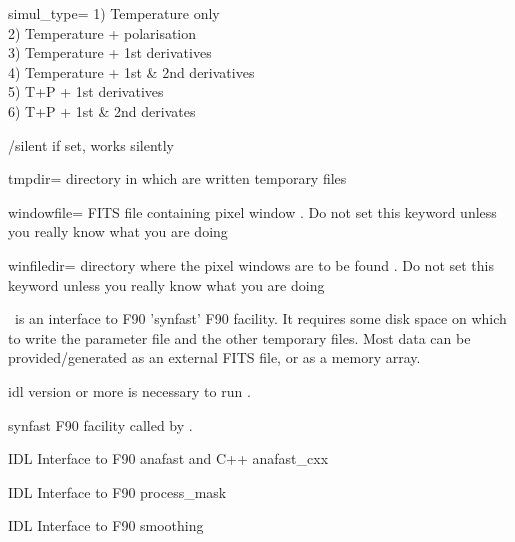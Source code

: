 \begin{keywords}
\begin{kwlist}{}
 \item[simul\_type=] 
        1) Temperature only \\
        2) Temperature + polarisation \\
        3) Temperature + 1st derivatives \\
        4) Temperature + 1st \& 2nd derivatives \\
        5) T+P + 1st derivatives \\
        6) T+P + 1st \& 2nd derivates

 \item[/silent]    if set, works silently

 \item[tmpdir=]      directory in which are written temporary files 

 \item[windowfile=]    FITS file containing pixel window 
        .
      Do not set this keyword unless you really know what you are doing

  \item[winfiledir=]     directory where the pixel windows are to be found 
        .
      Do not set this keyword unless you really know what you are doing

  \end{kwlist}
\end{keywords}  

\begin{codedescription}
{\thedocid\ is an interface to F90 'synfast' F90 facility. It
requires some disk space on which to write the parameter file and the other
temporary files. Most data can be provided/generated as an external FITS
file, or as a memory array.}
\end{codedescription}



\begin{related}
  \begin{sulist}{} %
    \item[idl] version \idlversion or more is necessary to run \thedocid.
    \item[synfast] F90 facility called by \thedocid.
    \item[\htmlref{ianafast}{idl:ianafast}] IDL Interface to F90 anafast and C++ anafast\_cxx
    \item[\htmlref{iprocess\_mask}{idl:iprocess_mask}] IDL Interface to F90 process\_mask
    \item[\htmlref{ismoothing}{idl:ismoothing}] IDL Interface to F90 smoothing
  \end{sulist}
\end{related}

